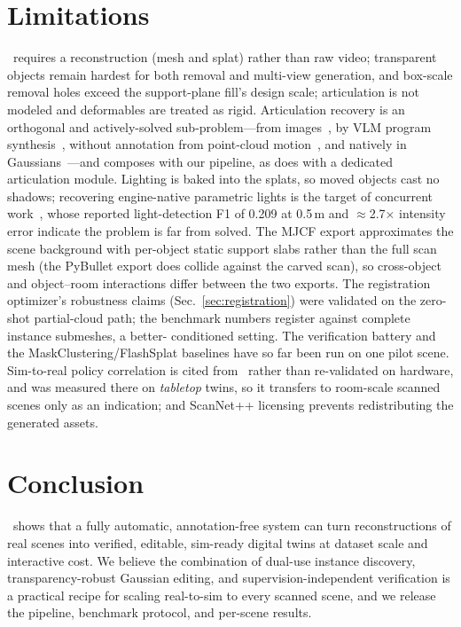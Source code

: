 \section{Limitations}
\name\ requires a reconstruction (mesh and splat) rather than raw video;
transparent objects remain hardest for both removal and multi-view
generation, and box-scale removal holes exceed the support-plane fill's
design scale; articulation is not modeled and deformables are treated
as rigid. Articulation recovery is an orthogonal and actively-solved
sub-problem---from images~\cite{urdformer}, by VLM program
synthesis~\cite{articulateanything}, without annotation from point-cloud
motion~\cite{autourdf}, and natively in Gaussians~\cite{artgs}---and
composes with our pipeline, as \cite{simfoundry} does with a dedicated
articulation module.
Lighting is baked into the splats, so moved objects cast no shadows;
recovering engine-native parametric lights is the target of concurrent
work~\cite{lumera}, whose reported light-detection F1 of 0.209 at 0.5\,m
and $\approx$2.7$\times$ intensity error indicate the problem is far from
solved.
The MJCF export approximates the scene background with
per-object static support slabs rather than the full scan mesh (the
PyBullet export does collide against the carved scan), so cross-object
and object--room interactions differ between the two exports. The
registration optimizer's robustness claims (Sec.~\ref{sec:registration})
were validated on the zero-shot partial-cloud path; the benchmark
numbers register against complete instance submeshes, a better-
conditioned setting. The verification battery and the
MaskClustering/FlashSplat baselines have so far been run on one pilot
scene. Sim-to-real policy correlation is cited from~\cite{simfoundry}
rather than re-validated on hardware, and was measured there on
\emph{tabletop} twins, so it transfers to room-scale scanned scenes only
as an indication; and ScanNet++ licensing prevents redistributing the
generated assets.

\section{Conclusion}
\name\ shows that a fully automatic, annotation-free system can turn
reconstructions of real scenes into verified, editable, sim-ready
digital twins at dataset scale and interactive cost. We believe the
combination of dual-use instance discovery, transparency-robust
Gaussian editing, and supervision-independent verification is a
practical recipe for scaling real-to-sim to every scanned scene, and we
release the pipeline, benchmark protocol, and per-scene results.
